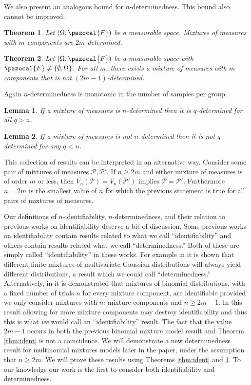 \documentclass[aos,preprint]{imsart}
\def\sF{\pazocal{F}}
\def\sP{\mathscr{P}}
\theoremstyle{plain}
\newtheorem{thm}{Theorem}[section]
\newtheorem{lem}{Lemma}[section]
\theoremstyle{defintion}
\begin{document}
	We also present an analogous bound for $n$-determinedness. This bound also cannot be improved.
	\begin{thm}\label{thm:det}
		Let $\left( \Omega,\sF \right)$ be a measurable space. Mixtures of measures with $m$ components are $2m$-determined.
	\end{thm}

	\begin{thm} \label{thm:nodet}
		Let $\left( \Omega, \sF \right)$ be a measurable space with $\sF \neq \left\{ \emptyset,\Omega \right\}$. For all $m$, there exists a mixture of measures with $m$ components that is not $(2m-1)$-determined.
	\end{thm}

	Again $n$-determinedness is monotonic in the number of samples per group.

	\begin{lem}\label{lem:det}
		If a mixture of measures is $n$-determined then it is $q$-determined for all $q>n$. 
	\end{lem}
	\begin{lem} \label{lem:nodet}
		If a mixture of measures is not $n$-determined then it is not $q$-determined for any $q<n$. 
	\end{lem}
	This collection of results can be interpreted in an alternative way. Consider some pair of mixtures of measures $\sP, \sP'$. If $n\ge2m$ and either mixture of measures is of order $m$ or less, then $V_n\left( \sP \right) = V_n\left( \sP' \right)$ implies $\sP = \sP'$. Furthermore $n=2m$ is the smallest value of $n$ for which the previous statement is true for all pairs of mixtures of measures.

	Our definitions of $n$-identifiability, $n$-determinedness, and their relation to previous works on identifiability deserve a bit of discussion. Some previous works on identifiability contain results related to what we call ``identifiability'' and others contain results related what we call ``determinedness.'' Both of these are simply called ``identifiability'' in these works. For example in \cite{yakowitz68} it is shown that different finite mixtures of multivariate Gaussian distributions will always yield different distributions, a result which we could call ``determinedness.'' Alternatively, in \cite{teicher63} it is demonstrated that mixtures of binomial distributions, with a fixed number of trials $n$ for every mixture component, are identifiable provided we only consider mixtures with $m$ mixture components and $n \ge 2m-1$. In this result allowing for more mixture components may destroy identifiability and thus this is what {\em we} would call an ``identifiability'' result. The fact that the value $2m-1$ occurs in both the previous binomial mixture model result and Theorem \ref{thm:ident} is not a coincidence. We will demonstrate a new determinedness result for multinomial mixtures models later in the paper, under the assumption that $n\ge 2m$. We will prove these results using Theorems \ref{thm:ident} and \ref{thm:det}. To our knowledge our work is the first to consider both identifiability and determinedness.
\end{document}
